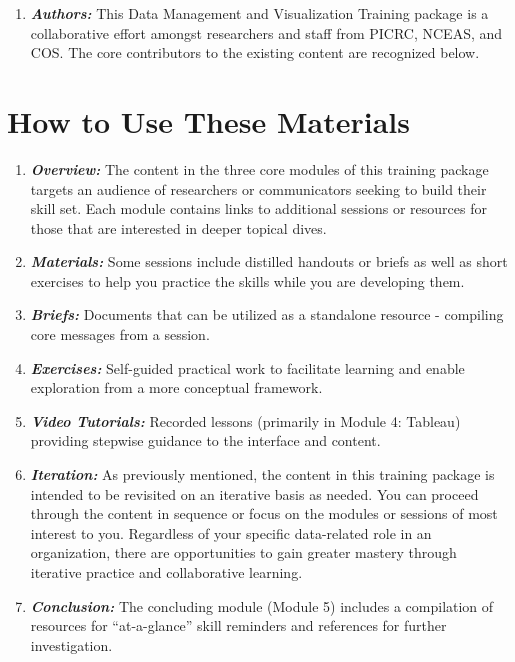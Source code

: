 \documentclass[
]{book}
\providecommand{\tightlist}{%
  \setlength{\itemsep}{0pt}\setlength{\parskip}{0pt}}
\begin{document}
\begin{enumerate}
\def\labelenumi{\arabic{enumi}.}
\setcounter{enumi}{4}
\tightlist
\item
  \textbf{\emph{Authors:}} This Data Management and Visualization Training package is a collaborative effort amongst researchers and staff from PICRC, NCEAS, and COS. The core contributors to the existing content are recognized below.
\end{enumerate}

\hypertarget{how-to-use-these-materials}{%
\section{How to Use These Materials}\label{how-to-use-these-materials}}

\begin{enumerate}
\def\labelenumi{\arabic{enumi}.}
\item
  \textbf{\emph{Overview:}} The content in the three core modules of this training package targets an audience of researchers or communicators seeking to build their skill set. Each module contains links to additional sessions or resources for those that are interested in deeper topical dives.
\item
  \textbf{\emph{Materials:}} Some sessions include distilled handouts or briefs as well as short exercises to help you practice the skills while you are developing them.
\item
  \textbf{\emph{Briefs:}} Documents that can be utilized as a standalone resource - compiling core messages from a session.
\item
  \textbf{\emph{Exercises:}} Self-guided practical work to facilitate learning and enable exploration from a more conceptual framework.
\item
  \textbf{\emph{Video Tutorials:}} Recorded lessons (primarily in Module 4: Tableau) providing stepwise guidance to the interface and content.
\item
  \textbf{\emph{Iteration:}} As previously mentioned, the content in this training package is intended to be revisited on an iterative basis as needed. You can proceed through the content in sequence or focus on the modules or sessions of most interest to you. Regardless of your specific data-related role in an organization, there are opportunities to gain greater mastery through iterative practice and collaborative learning.
\item
  \textbf{\emph{Conclusion:}} The concluding module (Module 5) includes a compilation of resources for ``at-a-glance'' skill reminders and references for further investigation.
\end{enumerate}
\end{document}
